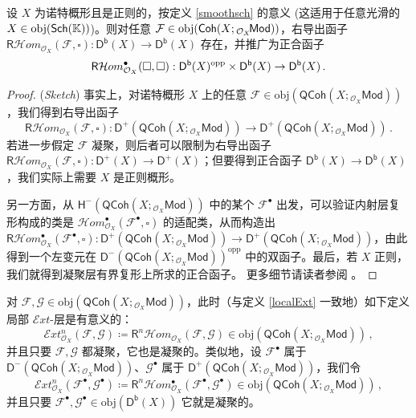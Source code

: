 \begin{Lem}
设 $X$ 为诺特概形且是正则的，按定义 \ref{smoothsch} 的意义 \textup{\big(}这适用于任意光滑的 $X\in\textup{obj}(\mathsf{Sch}(\mathbb{K}))$\textup{\big)}。则对任意 $\mathcal{F}\in\textup{obj}(\mathsf{Coh}(X;{}_{\mathcal{O}_X}\!\mathsf{Mod}))$，右导出函子 $\mathsf{R}\mathcal{H}om_{\mathcal{O}_X}(\mathcal{F},\square):\mathsf{D^b}(X)\rightarrow\mathsf{D^b}(X)$ 存在，并推广为正合函子
\[
\mathsf{R}\mathcal{H}om_{\mathcal{O}_X}^\bullet(\square,\square):\mathsf{D^b}(X)^\textup{opp}\times\mathsf{D^b}(X)\rightarrow\mathsf{D^b}(X)\,.
\] 
\end{Lem}

\begin{proof}(\textit{Sketch})
事实上，对诺特概形 $X$ 上的任意 $\mathcal{F}\in\text{obj}(\mathsf{QCoh}(X;{}_{\mathcal{O}_X}\!\mathsf{Mod}))$，我们得到右导出函子
\[
\mathsf{R}\mathcal{H}om_{\mathcal{O}_X}(\mathcal{F},\square):\mathsf{D^+}(\mathsf{QCoh}(X;{}_{\mathcal{O}_X}\!\mathsf{Mod}))\rightarrow\mathsf{D^+}(\mathsf{QCoh}(X;{}_{\mathcal{O}_X}\!\mathsf{Mod}))\,.
\]
若进一步假定 $\mathcal{F}$ 凝聚，则后者可以限制为右导出函子 $\mathsf{R}\mathcal{H}om_{\mathcal{O}_X}(\mathcal{F},\square):\mathsf{D^+}(X)\rightarrow\mathsf{D^+}(X)$；但要得到正合函子 $\mathsf{D^b}(X)\rightarrow\mathsf{D^b}(X)$，我们实际上需要 $X$ 是正则概形。

另一方面，从 $\mathsf{H^-}(\mathsf{QCoh}(X;{}_{\mathcal{O}_X}\!\mathsf{Mod}))$ 中的某个 $\mathcal{F}^\bullet$ 出发，可以验证内射层复形构成的类是 $\mathcal{H}om_{\mathcal{O}_X}^\bullet(\mathcal{F}^\bullet,\square)$ 的适配类，从而构造出 $\mathsf{R}\mathcal{H}om_{\mathcal{O}_X}^\bullet(\mathcal{F}^\bullet,\square):\mathsf{D^+}(\mathsf{QCoh}(X;{}_{\mathcal{O}_X}\!\mathsf{Mod}))\rightarrow\mathsf{D^+}(\mathsf{QCoh}(X;{}_{\mathcal{O}_X}\!\mathsf{Mod}))$，由此得到一个左变元在 $\mathsf{D^-}(\mathsf{QCoh}(X;{}_{\mathcal{O}_X}\!\mathsf{Mod}))^\text{opp}$ 中的双函子。最后，若 $X$ 正则，我们就得到凝聚层有界复形上所求的正合函子。
更多细节请读者参阅 \cite{[Huy06]}。
\end{proof}

对 $\mathcal{F},\mathcal{G}\in\text{obj}(\mathsf{QCoh}(X;{}_{\mathcal{O}_X}\!\mathsf{Mod}))$，此时（与定义 \ref{localExt} 一致地）如下定义局部 $\mathcal{E}xt$-层是有意义的：
\begin{equation}
\mathcal{E}xt_{\mathcal{O}_X}^n(\mathcal{F},\mathcal{G})\coloneqq\mathsf{R}^n\mathcal{H}om_{\mathcal{O}_X}(\mathcal{F},\mathcal{G})\in\text{obj}(\mathsf{QCoh}(X;{}_{\mathcal{O}_X}\!\mathsf{Mod}))\,,
\end{equation}
并且只要 $\mathcal{F},\mathcal{G}$ 都凝聚，它也是凝聚的。类似地，设 $\mathcal{F}^\bullet$ 属于 $\mathsf{D^-}(\mathsf{QCoh}(X;{}_{\mathcal{O}_X}\!\mathsf{Mod}))$、$\mathcal{G}^\bullet$ 属于 $\mathsf{D^+}(\mathsf{QCoh}(X;{}_{\mathcal{O}_X}\!\mathsf{Mod}))$，我们令
\begin{equation}
\mathcal{E}xt_{\mathcal{O}_X}^n(\mathcal{F}^\bullet,\mathcal{G}^\bullet)\coloneqq\mathsf{R}^n\mathcal{H}om_{\mathcal{O}_X}^\bullet(\mathcal{F}^\bullet,\mathcal{G}^\bullet)\in\text{obj}(\mathsf{QCoh}(X;{}_{\mathcal{O}_X}\!\mathsf{Mod}))\,,
\end{equation}
并且只要 $\mathcal{F}^\bullet,\mathcal{G}^\bullet\in\text{obj}(\mathsf{D^b}(X))$ 它就是凝聚的。

